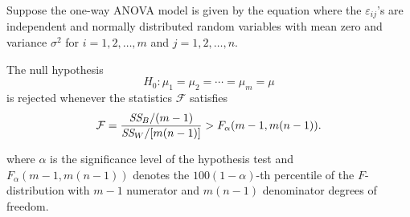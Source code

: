 \begin{theorem}
    Suppose the one-way ANOVA model is given by the equation 
    where the $\varepsilon_{ij}$'s are independent and normally 
    distributed random variables with mean zero and variance 
    $\sigma^2$ for $i = 1,2,\ldots, m$ and $j = 1,2,\ldots,n$.
    
    The null hypothesis 
    \[
        H_0 : \mu_1 = \mu_2 = \cdots = \mu_m = \mu
    \]
    is rejected whenever the statistics $\mathcal{F}$ satisfies 
    \begin{equation}
        \mathcal{F} = \frac{\textit{SS}_{B} / (m-1)}{\textit{SS}_{W} / [m(n-1)]} > F_\alpha(m-1, m(n-1)).
    \end{equation}

    where $\alpha$ is the significance level of the hypothesis test and $F_\alpha(m-1, m(n-1))$ 
    denotes the $100(1 - \alpha)$-th percentile of the $F$-distribution with $m-1$ numerator 
    and $m(n-1)$ denominator degrees of freedom.
\end{theorem}
